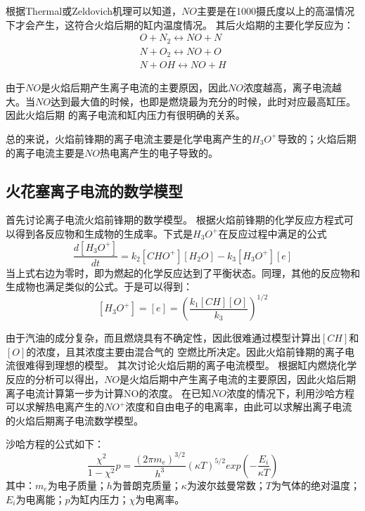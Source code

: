 根据Thermal或Zeldovich\cite{zeldovich1946oxidation}机理可以知道，$NO$主要是在1000摄氏度以上的高温情况下才会产生，这符合火焰后期的缸内温度情况。
其后火焰期的主要化学反应为：
\begin{align}
O+N_{2}\longleftrightarrow NO+N\\
N+O_{2}\longleftrightarrow NO+O\\
N+OH\longleftrightarrow NO+H
\end{align}
\par
由于$NO$是火焰后期产生离子电流的主要原因，因此$NO$浓度越高，离子电流越大。当$NO$达到最大值的时候，也即是燃烧最为充分的时候，此时对应最高缸压。因此火焰后期
的离子电流和缸内压力有很明确的关系。\par
总的来说，火焰前锋期的离子电流主要是化学电离产生的$H_{3}O^{+}$导致的；火焰后期的离子电流主要是$NO$热电离产生的电子导致的。
\subsection{火花塞离子电流的数学模型}
首先讨论离子电流火焰前锋期的数学模型。
根据火焰前锋期的化学反应方程式可以得到各反应物和生成物的生成率。下式是$H_{3}O^{+}$在反应过程中满足的公式
\begin{equation}
\frac{d[H_{3}O^{+}]}{dt}=k_{2}[CHO^{+}][H_{2}O]-k_{3}[H_{3}O^{+}][e]
\end{equation}
当上式右边为零时，即为燃起的化学反应达到了平衡状态。同理，其他的反应物和生成物也满足类似的公式。于是可以得到：
\begin{equation}
	[H_{3}O^{+}]=[e]=(\frac{k_{1}[CH][O]}{k_{3}})^{1/2}
\end{equation}
\par  由于汽油的成分复杂，而且燃烧具有不确定性，因此很难通过模型计算出$[CH]$和$[O]$的浓度，且其浓度主要由混合气的
空燃比所决定。因此火焰前锋期的离子电流很难得到理想的模型。
其次讨论火焰后期的离子电流模型。
根据缸内燃烧化学反应的分析可以得出，$NO$是火焰后期中产生离子电流的主要原因，因此火焰后期离子电流计算第一步为计算NO的浓度。
在已知$NO$浓度的情况下，利用沙哈方程可以求解热电离产生的$NO^{+}$浓度和自由电子的电离率，由此可以求解出离子电流的火焰后期离子电流数学模型。\par 
沙哈方程的公式如下：
	\begin{equation}
		\frac{\chi^{2}}{1-\chi^{2}}p=\frac{(2\pi m_{e})^{3/2}}{h^{3}}(\kappa T)^{5/2}exp(-\frac{E_{i}}{\kappa T})
	\end{equation}
其中：$m_{e}$为电子质量；$h$为普朗克质量；$\kappa$为波尔兹曼常数；$T$为气体的绝对温度；$E_{i}$为电离能；$p$为缸内压力；$\chi$为电离率。\par 
